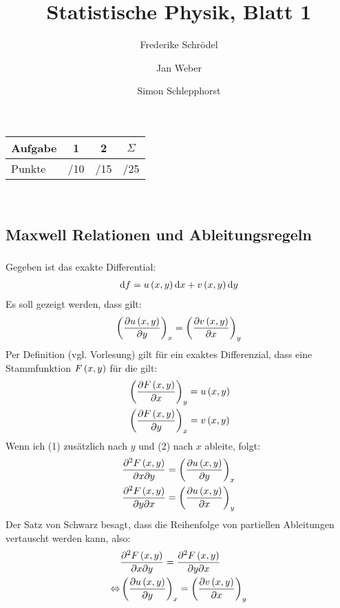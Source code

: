 \documentclass[11pt, ngerman, fleqn, DIV=15, headinclude]{scrartcl}
\title{Statistische Physik, Blatt 1}
\author{
    Frederike Schrödel \and Jan Weber \and Simon Schlepphorst
}
\begin{document}
\maketitle
\begin{center}
	\begin{tabular}{l|c|c|c}
		Aufgabe &1&2&$\Sigma$\\
		\hline
		Punkte &\quad /10 & \quad /15 & \quad /25 
	\end{tabular}\\
\end{center}


\setcounter{section}{1}

\subsection{Maxwell Relationen und Ableitungsregeln}

\subsubsection{}
Gegeben ist das exakte Differential:
\begin{align*}
	\mathop{}\!\mathrm d f = u\left( x,y \right)\mathop{}\!\mathrm d x + v\left( x,y \right)\mathop{}\!\mathrm d y
\end{align*}
Es soll gezeigt werden, dass gilt:
\begin{align*}
	\left( \frac{\partial {u\left( x,y \right)}}{\partial {y}} \right)_x = \left( \frac{\partial {v\left( x,y \right)}}{\partial {x}} \right)_y
\end{align*}
Per Definition (vgl. Vorlesung) gilt für ein exaktes Differenzial, dass eine Stammfunktion $F\left( x,y \right)$ für die gilt:
\begin{align}
	&\left( \frac{\partial {F\left( x,y \right)}}{\partial {x}} \right)_y = u\left( x,y \right)\\
	&\left( \frac{\partial {F\left( x,y \right)}}{\partial {y}} \right)_x = v\left( x,y \right)
\end{align}
Wenn ich (1) zusätzlich nach $y$ und (2) nach $x$ ableite, folgt:
\begin{align*}
	&\frac{\partial^2F\left( x,y \right)}{\partial x\partial y} = \left( \frac{\partial {u\left( x,y \right)}}{\partial {y}} \right)_x\\
	&\frac{\partial^2F\left( x,y \right)}{\partial y\partial x} = \left( \frac{\partial {u\left( x,y \right)}}{\partial {x}} \right)_y
\end{align*}
Der Satz von Schwarz besagt, dass die Reihenfolge von partiellen Ableitungen vertauscht werden kann, also:
\begin{align*}
	&\frac{\partial^2F\left( x,y \right)}{\partial x\partial y} = \frac{\partial^2F\left( x,y \right)}{\partial y\partial x}\\
	\Leftrightarrow&\left( \frac{\partial {u\left( x,y \right)}}{\partial {y}} \right)_x = \left( \frac{\partial {v\left( x,y \right)}}{\partial {x}} \right)_y
\end{align*}
\end{document}
